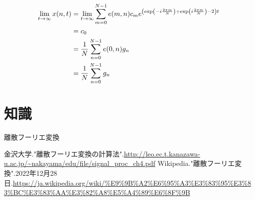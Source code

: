 \documentclass[a4paper, 10pt, dvipdfmx]{jlreq}
\begin{document}
\begin{align*}
  \lim_{t\to\infty}x(n,t) & =\lim_{t\to\infty}\sum_{m=0}^{N-1}e(m,n)c_me^{\qty(\exp(-i\frac{2\pi m}{N})+\exp(i\frac{2\pi m}{N})-2)t} \\
                          & =c_0                                                                                                     \\
                          & =\frac{1}{N}\sum_{n=0}^{N-1}e(0,n)g_n                                                                    \\
                          & =\frac{1}{N}\sum_{n=0}^{N-1}g_n                                                                          \\
\end{align*}

\section{知識}

離散フーリエ変換

\begin{thebibliography}{9}
  金沢大学."離散フーリエ変換の計算法".\url{http://leo.ec.t.kanazawa-u.ac.jp/~nakayama/edu/file/signal_proc_ch4.pdf}
  Wikipedia."離散フーリエ変換".2022年12月28日.\url{https://ja.wikipedia.org/wiki/%E9%9B%A2%E6%95%A3%E3%83%95%E3%83%BC%E3%83%AA%E3%82%A8%E5%A4%89%E6%8F%9B}
\end{thebibliography}
\end{document}
